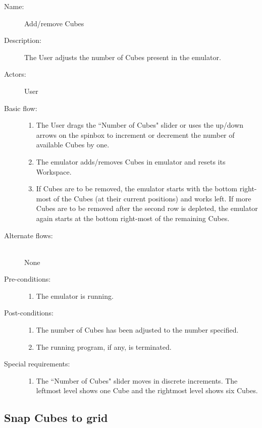\documentclass[12pt]{article}
\begin{document}
    \begin{description}
      \item[Name:] Add/remove Cubes
      \item[Description:] The User adjusts the number of Cubes present in the emulator.
      \item[Actors:] User
      \item[Basic flow:] \hfill
        \begin{enumerate}
	  \item{The User drags the ``Number of Cubes" slider or uses the up/down arrows on the spinbox to increment or decrement the number of available Cubes by one.}
	  \item{The emulator adds/removes Cubes in emulator and resets its Workspace.}
	  \item{If Cubes are to be removed, the emulator starts with the bottom right-most of the Cubes (at their current positions) and works left. If more Cubes are to be removed after the second row is depleted, the emulator again starts at the bottom right-most of the remaining Cubes.}
        \end{enumerate}
      \item[Alternate flows:] \hfill \\
	None
      \item[Pre-conditions:] \hfill
        \begin{enumerate}
	  \item{The emulator is running.}
        \end{enumerate}
      \item[Post-conditions:] \hfill
        \begin{enumerate}
	  \item{The number of Cubes has been adjusted to the number specified.}
	  \item{The running program, if any, is terminated.}
        \end{enumerate}
	  \item[Special requirements:] \hfill
        \begin{enumerate}
		\item{The ``Number of Cubes" slider moves in discrete increments. The leftmost level shows one Cube and the rightmost level shows six Cubes.}
		\end{enumerate}
    \end{description}

  \subsection{Snap Cubes to grid}
\end{document}
